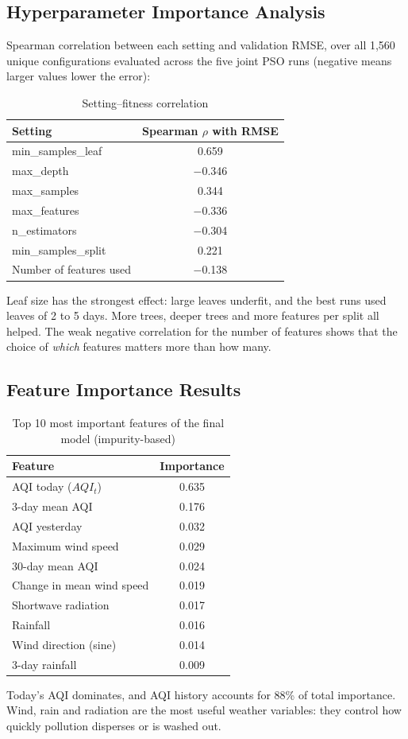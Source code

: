 \subsection{Hyperparameter Importance Analysis}

Spearman correlation between each setting and validation RMSE, over all 1,560 unique configurations evaluated across the five joint PSO runs (negative means larger values lower the error):

\begin{table}[H]
\centering
\caption{Setting--fitness correlation}
\begin{tabular}{|l|c|}
\hline
\textbf{Setting} & \textbf{Spearman $\rho$ with RMSE} \\ \hline
min\_samples\_leaf & 0.659 \\
max\_depth & $-$0.346 \\
max\_samples & 0.344 \\
max\_features & $-$0.336 \\
n\_estimators & $-$0.304 \\
min\_samples\_split & 0.221 \\
Number of features used & $-$0.138 \\ \hline
\end{tabular}
\end{table}
Leaf size has the strongest effect: large leaves underfit, and the best runs used leaves of 2 to 5 days. More trees, deeper trees and more features per split all helped. The weak negative correlation for the number of features shows that the choice of \emph{which} features matters more than how many.

\subsection{Feature Importance Results}
\begin{table}[H]
\centering
\caption{Top 10 most important features of the final model (impurity-based)}
\begin{tabular}{|l|c|}
\hline
\textbf{Feature} & \textbf{Importance} \\ \hline
AQI today ($AQI_t$) & 0.635 \\
3-day mean AQI & 0.176 \\
AQI yesterday & 0.032 \\
Maximum wind speed & 0.029 \\
30-day mean AQI & 0.024 \\
Change in mean wind speed & 0.019 \\
Shortwave radiation & 0.017 \\
Rainfall & 0.016 \\
Wind direction (sine) & 0.014 \\
3-day rainfall & 0.009 \\ \hline
\end{tabular}
\end{table}
Today's AQI dominates, and AQI history accounts for 88\% of total importance. Wind, rain and radiation are the most useful weather variables: they control how quickly pollution disperses or is washed out.

